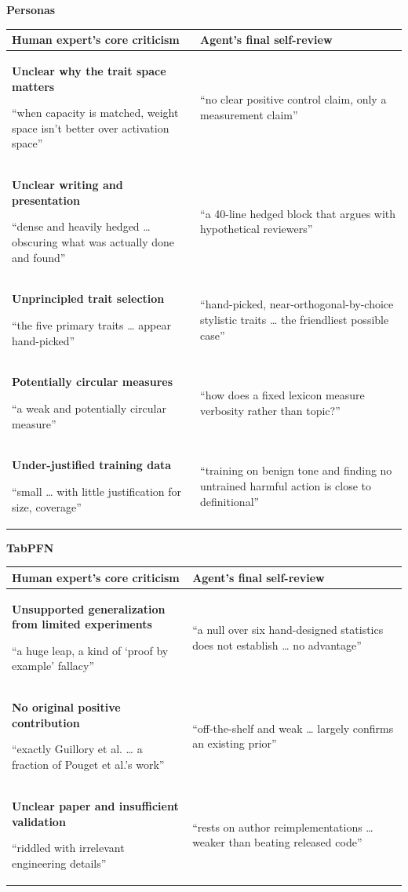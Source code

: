 {\footnotesize\headingfont
\renewcommand{\arraystretch}{1.18}
\setlength{\tabcolsep}{5pt}
\begin{minipage}[t]{0.6\linewidth}
\textbf{Personas}\par\smallskip
\begin{tabularx}{\linewidth}{@{}Y Y@{}}
\toprule
\textbf{Human expert's core criticism} & \textbf{Agent's final self-review} \\
\midrule
\textbf{Unclear why the trait space matters}\par
``when capacity is matched, weight space isn't better over activation space''
& ``no clear positive control claim, only a measurement claim'' \\
\addlinespace
\textbf{Unclear writing and presentation}\par
``dense and heavily hedged \ldots{} obscuring what was actually done and found''
& ``a 40-line hedged block that argues with hypothetical reviewers'' \\
\addlinespace
\textbf{Unprincipled trait selection}\par
``the five primary traits \ldots{} appear hand-picked''
& ``hand-picked, near-orthogonal-by-choice stylistic traits \ldots{} the
friendliest possible case'' \\
\addlinespace
\textbf{Potentially circular measures}\par
``a weak and potentially circular measure''
& ``how does a fixed lexicon measure verbosity rather than topic?'' \\
\addlinespace
\textbf{Under-justified training data}\par
``small \ldots{} with little justification for size, coverage''
& ``training on benign tone and finding no untrained harmful action is close
to definitional'' \\
\bottomrule
\end{tabularx}
\end{minipage}\hfill
\begin{minipage}[t]{0.36\linewidth}
\textbf{TabPFN}\par\smallskip
\begin{tabularx}{\linewidth}{@{}Y Y@{}}
\toprule
\textbf{Human expert's core criticism} & \textbf{Agent's final self-review} \\
\midrule
\textbf{Unsupported generalization from limited experiments}\par
``a huge leap, a kind of `proof by example' fallacy''
& ``a null over six hand-designed statistics does not establish \ldots{} no
advantage'' \\
\addlinespace
\textbf{No original positive contribution}\par
``exactly Guillory et al. \ldots{} a fraction of Pouget et al.'s work''
& ``off-the-shelf and weak \ldots{} largely confirms an existing prior'' \\
\addlinespace
\textbf{Unclear paper and insufficient validation}\par
``riddled with irrelevant engineering details''
& ``rests on author reimplementations \ldots{} weaker than beating released
code'' \\
\bottomrule
\end{tabularx}
\end{minipage}
}
